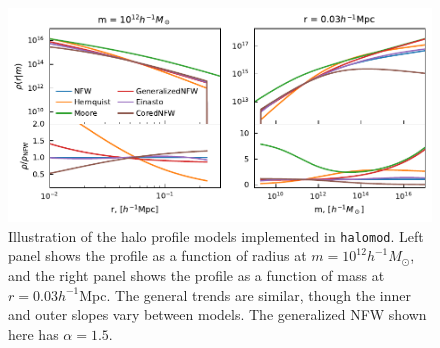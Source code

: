 \documentclass[5p,aas_macros]{elsarticle}
\begin{document}
\begin{figure}
    \centering
    \includegraphics{profile_models.pdf}
    \caption{Illustration of the halo profile models implemented in \texttt{halomod}. Left panel shows the profile as a function of radius at $m=10^{12} h^{-1}M_\odot$, and the right panel shows the profile as a function of mass at $r = 0.03 h^{-1}$Mpc. The general trends are similar, though the inner and outer slopes vary between models. The generalized NFW shown here has $\alpha=1.5$.}
    \label{fig:profiles}
\end{figure}
\end{document}
